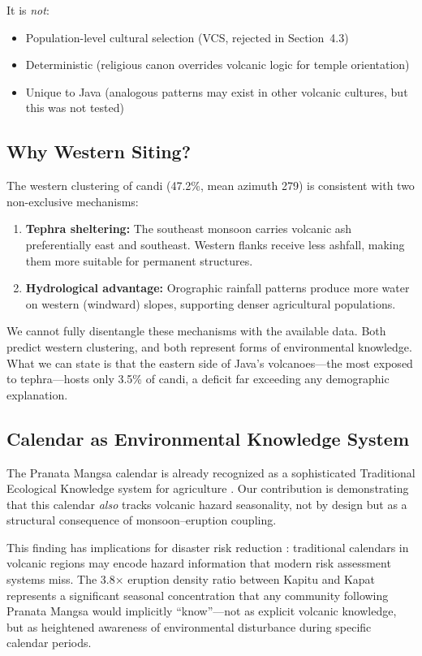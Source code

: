 \documentclass[12pt,a4paper]{article}
\begin{document}
It is \emph{not}:
\begin{itemize}
    \item Population-level cultural selection (VCS, rejected in Section~4.3)
    \item Deterministic (religious canon overrides volcanic logic for temple orientation)
    \item Unique to Java (analogous patterns may exist in other volcanic cultures, but this was not tested)
\end{itemize}

\subsection{Why Western Siting?}

The western clustering of candi (47.2\%, mean azimuth 279\textdegree) is consistent with two non-exclusive mechanisms:

\begin{enumerate}
    \item \textbf{Tephra sheltering:} The southeast monsoon carries volcanic ash preferentially east and southeast. Western flanks receive less ashfall, making them more suitable for permanent structures.
    \item \textbf{Hydrological advantage:} Orographic rainfall patterns produce more water on western (windward) slopes, supporting denser agricultural populations.
\end{enumerate}

We cannot fully disentangle these mechanisms with the available data. Both predict western clustering, and both represent forms of environmental knowledge. What we can state is that the eastern side of Java's volcanoes---the most exposed to tephra---hosts only 3.5\% of candi, a deficit far exceeding any demographic explanation.

\subsection{Calendar as Environmental Knowledge System}

The Pranata Mangsa calendar is already recognized as a sophisticated Traditional Ecological Knowledge system for agriculture \citep{daldjoeni1984}. Our contribution is demonstrating that this calendar \emph{also} tracks volcanic hazard seasonality, not by design but as a structural consequence of monsoon--eruption coupling.

This finding has implications for disaster risk reduction \citep{lavigne2008}: traditional calendars in volcanic regions may encode hazard information that modern risk assessment systems miss. The 3.8$\times$ eruption density ratio between Kapitu and Kapat represents a significant seasonal concentration that any community following Pranata Mangsa would implicitly ``know''---not as explicit volcanic knowledge, but as heightened awareness of environmental disturbance during specific calendar periods.
\end{document}
